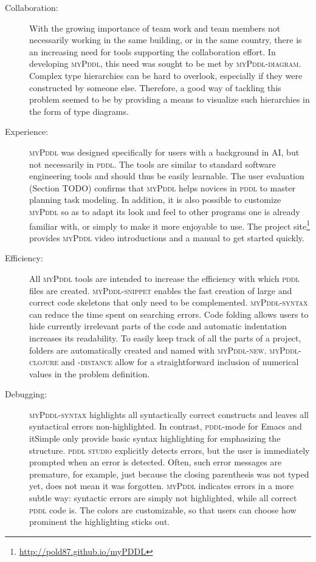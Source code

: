 \documentclass[runningheads]{llncs}
\newcommand{\mypddl}{\textsc{myPddl}\xspace}
\newcommand{\mypddlclojure}{\textsc{myPddl-clojure}\xspace}
\newcommand{\mypddlsyntax}{\textsc{myPddl-syntax}\xspace}
\newcommand{\mypddldiagram}{\textsc{myPddl-diagram}\xspace}
\newcommand{\mypddlnew}{\textsc{myPddl-new}\xspace}
\newcommand{\mypddlsnippet}{\textsc{myPddl-snippet}\xspace}
\newcommand{\pddlstudio}{\textsc{pddl studio}\xspace}
\newcommand{\pddlmode}{\textsc{pddl}-mode\xspace}
\newcommand{\pddl}{\textsc{pddl}\xspace}
\begin{document}
\begin{description}

\item[Collaboration:] With the growing importance of team work and
  team members not necessarily working in the same building, or in the
  same country, there is an increasing need for tools supporting the
  collaboration effort. In developing \mypddl, this need was sought to
  be met by \mypddldiagram. Complex type hierarchies can be hard to
  overlook, especially if they were constructed by someone
  else. Therefore, a good way of tackling this problem seemed to be by
  providing a means to visualize such hierarchies in the form of type
  diagrams.

\item[Experience:] \mypddl was designed specifically for users with a
  background in AI, but not necessarily in \pddl. The tools are
  similar to standard software engineering tools and should thus be
  easily learnable. The user evaluation (Section TODO) confirms that
  \mypddl helps novices in \pddl to master planning task modeling. In
  addition, it is also possible to customize \mypddl so as to adapt
  its look and feel to other programs one is already familiar with, or
  simply to make it more enjoyable to use. The project
  site\footnote{\url{http://pold87.github.io/myPDDL}} provides \mypddl
  video introductions and a manual to get started quickly.

\item[Efficiency:] All \mypddl tools are intended to increase the
  efficiency with which \pddl files are created. \mypddlsnippet
  enables the fast creation of large and correct code skeletons that
  only need to be complemented. \mypddlsyntax can reduce the time
  spent on searching errors. Code folding allows users to hide
  currently irrelevant parts of the code and automatic indentation
  increases its readability. To easily keep track of all the parts of
  a project, folders are automatically created and named with
  \mypddlnew. \mypddlclojure and \textsc{-distance} allow
  for a straightforward inclusion of numerical values in the problem
  definition.

\item[Debugging:] \mypddl\textsc{-syntax} highlights all syntactically
  correct constructs and leaves all syntactical errors
  non-highlighted. In contrast, \pddlmode for Emacs and itSimple only
  provide basic syntax highlighting for emphasizing the
  structure. \pddlstudio explicitly detects errors, but the user is
  immediately prompted when an error is detected. Often, such error
  messages are premature, for example, just because the closing
  parenthesis was not typed yet, does not mean it was
  forgotten. \mypddl indicates errors in a more subtle way: syntactic
  errors are simply not highlighted, while all correct \pddl code
  is. The colors are customizable, so that users can choose how
  prominent the highlighting sticks out.


\end{description}
\end{document}
